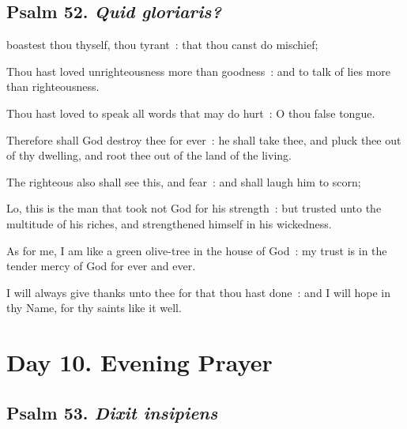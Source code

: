 \subsection{Psalm 52. \textit{Quid gloriaris?}}


 boastest thou thyself, thou tyrant~: that thou canst do mischief;\par
{}
Thou hast loved unrighteousness more than goodness~: and to talk of lies more than righteousness.\par
{}Thou hast loved to speak all words that may do hurt~: O thou false tongue.\par
{}Therefore shall God destroy thee for ever~: he shall take thee, and pluck thee out of thy dwelling, and root thee out of the land of the living.\par
{}The righteous also shall see this, and fear~: and shall laugh him to scorn;\par
{}Lo, this is the man that took not God for his strength~: but trusted unto the multitude of his riches, and strengthened himself in his wickedness.\par
{}As for me, I am like a green olive-tree in the house of God~: my trust is in the tender mercy of God for ever and ever.\par
{}I will always give thanks unto thee for that thou hast done~: and I will hope in thy Name, for thy saints like it well.\par

\section*{Day 10. Evening Prayer}

\subsection{Psalm 53. \textit{Dixit insipiens}}


